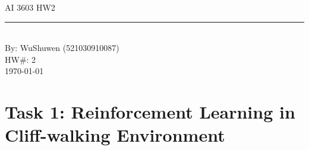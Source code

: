 \documentclass[aps,letterpaper,10pt]{revtex4}
\newcommand{\labtitle}{AI 3603 HW2}
\newcommand{\authorname}{WuShuwen (521030910087)}
\newcommand{\hw}{2}
\begin{document}


\begin{titlepage}
\begin{center}
{\Large \textsc{\labtitle} \\ \vspace{4pt}}
\rule[13pt]{\textwidth}{1pt} \\ \vspace{150pt}
{\large By: \authorname \\ \vspace{10pt}
HW\#: \hw \\ \vspace{10pt}
\today}
\end{center}
\end{titlepage}

\section{Task 1: Reinforcement Learning in Cliff-walking Environment}
\begin{figure}[H]
	  \centering
	  \caption{}
	  \label{fig:oscil}
	\end{figure}
	
\begin{figure}[H]
	  \centering
	  \caption{}
	  \label{fig:oscil}
	\end{figure}
\end{document}

